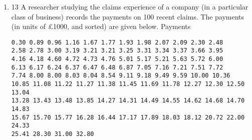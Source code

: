 \documentclass[a4paper,12pt]{article}
\begin{document}
\begin{enumerate}
\item
13 A researcher studying the claims experience of a company (in a particular class of business) records the payments on 100 recent claims. The payments (in units of £1000, and sorted) are given below.
Payments
\begin{verbatim}
0.30 0.89 0.96 1.16 1.67 1.77 1.93 1.98 2.07 2.09 2.30 2.48
2.58 2.78 3.00 3.19 3.21 3.21 3.25 3.31 3.34 3.37 3.66 3.95
4.16 4.18 4.60 4.72 4.73 4.76 5.01 5.17 5.21 5.63 5.72 6.00
6.13 6.17 6.24 6.37 6.47 6.48 6.87 7.05 7.16 7.21 7.51 7.72
7.74 8.00 8.00 8.03 8.04 8.54 9.11 9.18 9.49 9.59 10.00 10.36
10.85 11.08 11.22 11.27 11.38 11.45 11.69 11.78 12.27 12.30 12.50 13.04
13.28 13.43 13.48 13.85 14.27 14.31 14.49 14.55 14.62 14.68 14.70 14.83
15.67 15.70 15.77 16.28 16.44 17.17 17.89 18.03 18.12 20.72 22.00 24.33
25.41 28.30 31.00 32.80
\end{verbatim}


\end{enumerate}
\end{document}

